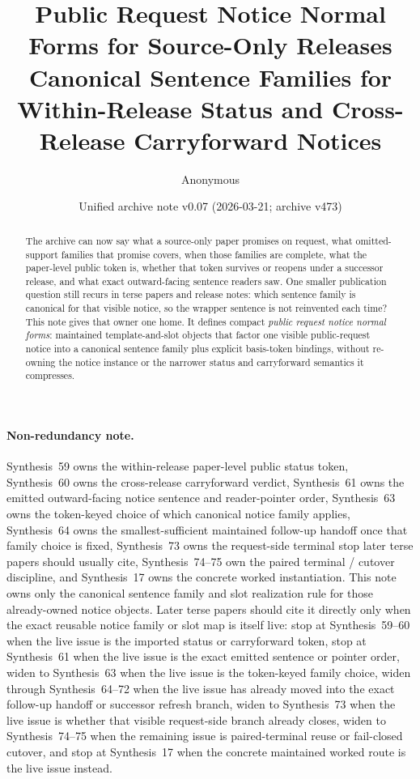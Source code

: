 \documentclass[11pt]{article}
\title{Public Request Notice Normal Forms for Source-Only Releases\\\large Canonical Sentence Families for Within-Release Status and Cross-Release Carryforward Notices}
\author{Anonymous}
\date{Unified archive note v0.07 (2026-03-21; archive v473)}
\begin{document}
\maketitle

\begin{abstract}
The archive can now say what a source-only paper promises on request, what omitted-support families that promise covers, when those families are complete, what the paper-level public token is, whether that token survives or reopens under a successor release, and what exact outward-facing sentence readers saw. One smaller publication question still recurs in terse papers and release notes: which sentence family is canonical for that visible notice, so the wrapper sentence is not reinvented each time? This note gives that owner one home. It defines compact \emph{public request notice normal forms}: maintained template-and-slot objects that factor one visible public-request notice into a canonical sentence family plus explicit basis-token bindings, without re-owning the notice instance or the narrower status and carryforward semantics it compresses.
\end{abstract}

\paragraph{Non-redundancy note.}
Synthesis~59 owns the within-release paper-level public status token, Synthesis~60 owns the cross-release carryforward verdict, Synthesis~61 owns the emitted outward-facing notice sentence and reader-pointer order, Synthesis~63 owns the token-keyed choice of which canonical notice family applies, Synthesis~64 owns the smallest-sufficient maintained follow-up handoff once that family choice is fixed, Synthesis~73 owns the request-side terminal stop later terse papers should usually cite, Synthesis~74--75 own the paired terminal / cutover discipline, and Synthesis~17 owns the concrete worked instantiation.\cite{series:publicrequeststatusenvelopes,series:publicrequestcarryforward,series:publicrequestnotices,series:publicrequestnoticeselections,series:publicrequestresponsemenus,series:publicrequestresponsepacketrefreshresponsepacketclosureverdicts,series:pairedterminalcitationdiscipline,series:pairedterminalcutoverrule,series:workedexample}
This note owns only the canonical sentence family and slot realization rule for those already-owned notice objects. Later terse papers should cite it directly only when the exact reusable notice family or slot map is itself live: stop at Synthesis~59--60 when the live issue is the imported status or carryforward token, stop at Synthesis~61 when the live issue is the exact emitted sentence or pointer order, widen to Synthesis~63 when the live issue is the token-keyed family choice, widen through Synthesis~64--72 when the live issue has already moved into the exact follow-up handoff or successor refresh branch, widen to Synthesis~73 when the live issue is whether that visible request-side branch already closes, widen to Synthesis~74--75 when the remaining issue is paired-terminal reuse or fail-closed cutover, and stop at Synthesis~17 when the concrete maintained worked route is the live issue instead.
\end{document}
